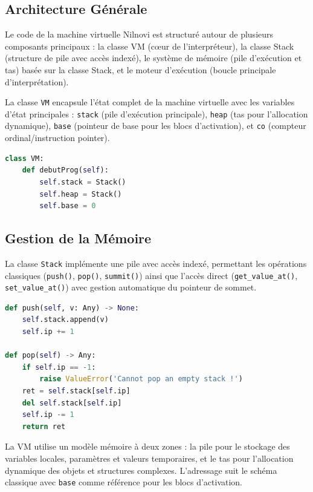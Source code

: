 \documentclass[a4paper, 12pt]{article}
\begin{document}
    \subsection{Architecture Générale}

    Le code de la machine virtuelle Nilnovi est structuré autour de plusieurs composants principaux : la classe VM (cœur de l'interpréteur), la classe Stack (structure de pile avec accès indexé), le système de mémoire (pile d'exécution et tas) basée sur la classe Stack, et le moteur d'exécution (boucle principale d'interprétation).

    La classe \texttt{VM} encapsule l'état complet de la machine virtuelle avec les variables d'état principales : \texttt{stack} (pile d'exécution principale), \texttt{heap} (tas pour l'allocation dynamique), \texttt{base} (pointeur de base pour les blocs d'activation), et \texttt{co} (compteur ordinal/instruction pointer).

    \begin{lstlisting}[caption=Structure principale de la VM,language=python, xleftmargin=20pt]
class VM:
    def debutProg(self):
        self.stack = Stack()
        self.heap = Stack()
        self.base = 0 \end{lstlisting}

    \subsection{Gestion de la Mémoire}

    La classe \texttt{Stack} implémente une pile avec accès indexé, permettant les opérations classiques (\texttt{push()}, \texttt{pop()}, \texttt{summit()}) ainsi que l'accès direct (\texttt{get\_value\_at()}, \texttt{set\_value\_at()}) avec gestion automatique du pointeur de sommet.

    \begin{lstlisting}[caption=Implémentation de la pile,language=python, xleftmargin=20pt]
def push(self, v: Any) -> None:
    self.stack.append(v)
    self.ip += 1

def pop(self) -> Any:
    if self.ip == -1:
        raise ValueError('Cannot pop an empty stack !')
    ret = self.stack[self.ip]
    del self.stack[self.ip]
    self.ip -= 1
    return ret \end{lstlisting}

    La VM utilise un modèle mémoire à deux zones : la pile pour le stockage des variables locales, paramètres et valeurs temporaires, et le tas pour l'allocation dynamique des objets et structures complexes. L'adressage suit le schéma classique avec \texttt{base} comme référence pour les blocs d'activation.
\end{document}
